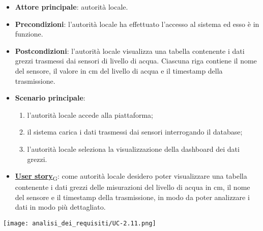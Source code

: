 \begin{itemize}
	\item \textbf{Attore principale}: autorità locale.
	\item \textbf{Precondizioni}: l'autorità locale ha effettuato l'accesso al sistema ed esso è in funzione.
	\item \textbf{Postcondizioni}: l'autorità locale visualizza una tabella contenente i dati grezzi trasmessi dai sensori di livello di acqua.
	      Ciascuna riga contiene il nome del sensore, il valore in cm del livello di acqua e il timestamp della trasmissione.
	\item \textbf{Scenario principale}:
	      \begin{enumerate}
		      \item l'autorità locale accede alla piattaforma;
		      \item il sistema carica i dati trasmessi dai sensori interrogando il database;
		      \item l'autorità locale seleziona la visualizzazione della dashboard dei dati grezzi.
	      \end{enumerate}
	\item \href{https://7last.github.io/docs/rtb/documentazione-interna/glossario\#user-story}{\textbf{User story}\textsubscript{G}}:
	      come autorità locale desidero poter visualizzare una tabella contenente i dati grezzi delle misurazioni del livello di acqua in cm,
	      il nome del sensore e il timestamp della trasmissione, in modo da poter analizzare i dati in modo più dettagliato.
\end{itemize}
\begin{center}
	\texttt{[image: analisi\_dei\_requisiti/UC-2.11.png]}
\end{center}


